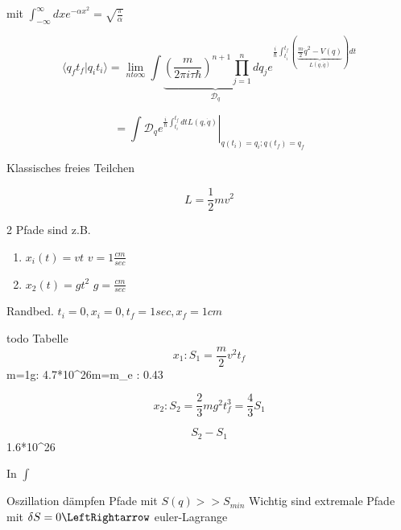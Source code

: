 mit \(\int_{-\infty}^\infty dxe^{-\alpha x^2}=\sqrt{\frac{\pi}{\alpha}}\)


\[\langle q_ft_f|q_it_i\rangle = \lim_{n to \infty} \int \underbrace{(\frac{m}{2\pi i\tau \hbar})^{n+1}\prod_{j=1}^n dq_j}_{\mathcal D_q}e^{\frac{i}{\hbar}\int_{t_i}^{t_f}(\underbrace{\frac{m}{2}\dot q^2-V(q)}_{L(q,\dot q)})dt}\]

\[=\left.\int \mathcal D_q e^{\frac{i}{\hbar}\int_{t_i}^{t_f}dtL(q,\dot q)}\right|_{q(t_i)=q_i; q(t_f) = q_f}\]


Klassisches freies Teilchen

\[L = \frac{1}{2}mv^2\]

2 Pfade sind z.B. 
\begin{enumerate}
\item \(x_i(t) = vt\)  \(v=1\frac{cm}{sec}\)
\item \(x_2(t) = gt^2\) \(g = \frac{cm}{sec}\)
\end{enumerate}

Randbed. \(t_i = 0, x_i = 0, t_f = 1sec, x_f = 1cm\)


todo Tabelle
\[x_1: S_1 = \frac{m}{2} v^2 t_f\]    m=1g: 4.7*10^26\hbar    m=m_e :   0.43\hbar

\[x_2: S_2 = \frac{2}{3} mg^2 t^3_f= \frac{4}{3}S_1\]  

\[S_2-S_1\]    1.6*10^26\hbar

In \(\int\) 

Oszillation dämpfen Pfade mit \(S(q)>>S_{min}\)
Wichtig sind extremale Pfade mit \(\delta S = 0 \LeftRightarrow \) euler-Lagrange



